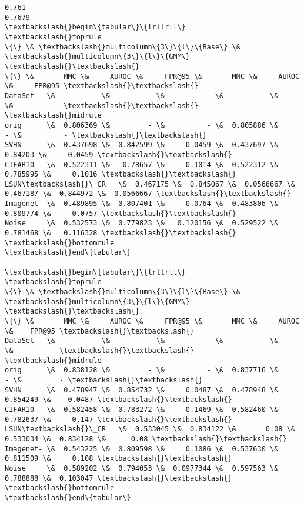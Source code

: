 \documentclass[11pt]{article}
\begin{document}
    \begin{Verbatim}[commandchars=\\\{\}]
0.761
0.7679
\textbackslash{}begin\{tabular\}\{lrllrll\}
\textbackslash{}toprule
\{\} \& \textbackslash{}multicolumn\{3\}\{l\}\{Base\} \& \textbackslash{}multicolumn\{3\}\{l\}\{GMM\} \textbackslash{}\textbackslash{}
\{\} \&       MMC \&     AUROC \&     FPR@95 \&       MMC \&     AUROC \&     FPR@95 \textbackslash{}\textbackslash{}
DataSet   \&           \&           \&            \&           \&           \&            \textbackslash{}\textbackslash{}
\textbackslash{}midrule
orig      \&  0.806369 \&         - \&          - \&  0.805886 \&         - \&          - \textbackslash{}\textbackslash{}
SVHN      \&  0.437698 \&  0.842599 \&     0.0459 \&  0.437697 \&   0.84203 \&     0.0459 \textbackslash{}\textbackslash{}
CIFAR10   \&  0.522311 \&   0.78657 \&     0.1014 \&  0.522312 \&  0.785995 \&     0.1016 \textbackslash{}\textbackslash{}
LSUN\textbackslash{}\_CR   \&  0.467175 \&  0.845067 \&  0.0566667 \&  0.467187 \&  0.844972 \&  0.0566667 \textbackslash{}\textbackslash{}
Imagenet- \&  0.489895 \&  0.807401 \&     0.0764 \&  0.483806 \&  0.809774 \&     0.0757 \textbackslash{}\textbackslash{}
Noise     \&  0.532573 \&  0.779823 \&   0.120156 \&  0.529522 \&  0.781468 \&   0.116328 \textbackslash{}\textbackslash{}
\textbackslash{}bottomrule
\textbackslash{}end\{tabular\}

\textbackslash{}begin\{tabular\}\{lrllrll\}
\textbackslash{}toprule
\{\} \& \textbackslash{}multicolumn\{3\}\{l\}\{Base\} \& \textbackslash{}multicolumn\{3\}\{l\}\{GMM\} \textbackslash{}\textbackslash{}
\{\} \&       MMC \&     AUROC \&     FPR@95 \&       MMC \&     AUROC \&    FPR@95 \textbackslash{}\textbackslash{}
DataSet   \&           \&           \&            \&           \&           \&           \textbackslash{}\textbackslash{}
\textbackslash{}midrule
orig      \&  0.838128 \&         - \&          - \&  0.837716 \&         - \&         - \textbackslash{}\textbackslash{}
SVHN      \&  0.478947 \&  0.854732 \&     0.0487 \&  0.478948 \&  0.854249 \&    0.0487 \textbackslash{}\textbackslash{}
CIFAR10   \&  0.582458 \&  0.783272 \&     0.1469 \&  0.582460 \&  0.782637 \&     0.147 \textbackslash{}\textbackslash{}
LSUN\textbackslash{}\_CR   \&  0.533045 \&  0.834122 \&       0.08 \&  0.533034 \&  0.834128 \&      0.08 \textbackslash{}\textbackslash{}
Imagenet- \&  0.543225 \&  0.809598 \&     0.1086 \&  0.537630 \&  0.811509 \&     0.108 \textbackslash{}\textbackslash{}
Noise     \&  0.589202 \&  0.794053 \&  0.0977344 \&  0.597563 \&  0.788888 \&  0.103047 \textbackslash{}\textbackslash{}
\textbackslash{}bottomrule
\textbackslash{}end\{tabular\}


    \end{Verbatim}


    
    
    
    
\end{document}
